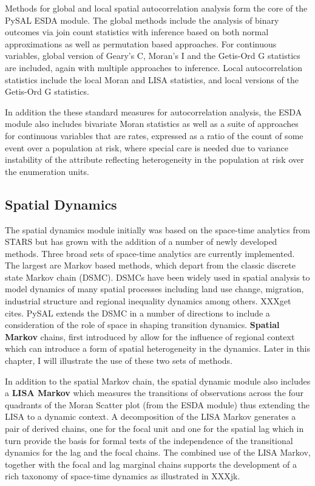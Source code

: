 \documentclass[11pt, titlepage]{article}
\begin{document}
Methods for global and local spatial autocorrelation analysis form the
core of the PySAL ESDA module. The global methods include the analysis
of binary outcomes via join count statistics with inference based on
both normal approximations as well as permutation based approaches. For
continuous variables, global version of Geary's C, Moran's I and the
Getis-Ord G statistics are included, again with multiple approaches to
inference. Local autocorrelation statistics include the local Moran and
LISA statistics, and local versions of the Getis-Ord G statistics.

In addition the these standard measures for autocorrelation analysis,
the ESDA module also includes bivariate Moran statistics as well as a
suite of approaches for continuous variables that are rates, expressed
as a ratio of the count of some event over a population at risk, where
special care is needed due to variance instability of the attribute
reflecting heterogeneity in the population at risk over the enumeration
units.

\subsection{Spatial Dynamics}

The spatial dynamics module initially was based on the space-time
analytics from STARS but has grown with the addition of a number of
newly developed methods. Three broad sets of space-time analytics are
currently implemented. The largest are Markov based methods, which
depart from the classic discrete state Markov chain (DSMC). DSMCs have
been widely used in spatial analysis to model dynamics of many spatial
processes including land use change, migration, industrial structure and
regional inequality dynamics among others. XXXget cites. PySAL extends
the DSMC in a number of directions to include a consideration of the
role of space in shaping transition dynamics. \textbf{Spatial Markov}
chains, first introduced by \cite{Rey:2001of} allow for the influence of regional
context which can introduce a form of spatial heterogeneity in the
dynamics. Later in this chapter, I will illustrate the use of these two
sets of methods.

In addition to the spatial Markov chain, the spatial dynamic module also
includes a \textbf{LISA Markov} which measures the transitions of
observations across the four quadrants of the Moran Scatter plot (from
the ESDA module) thus extending the LISA to a dynamic context. A
decomposition of the LISA Markov generates a pair of derived chains, one
for the focal unit and one for the spatial lag which in turn provide the
basis for formal tests of the independence of the transitional dynamics
for the lag and the focal chains. The combined use of the LISA Markov,
together with the focal and lag marginal chains supports the development
of a rich taxonomy of space-time dynamics as illustrated in XXXjk.
\end{document}
